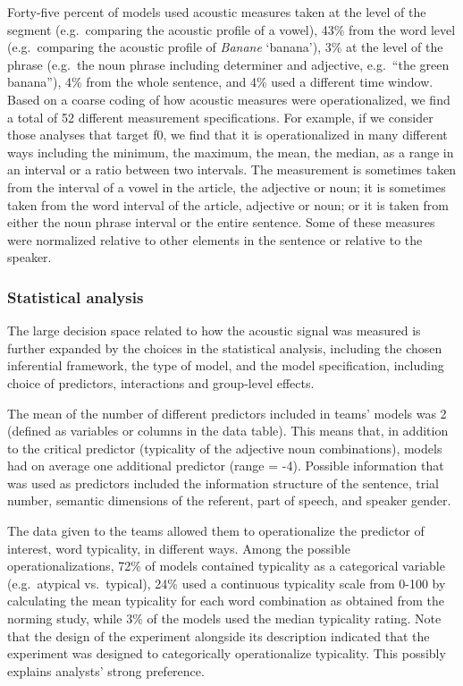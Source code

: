 \documentclass[Review,times,sageh]{sagej}
\begin{document}
Forty-five percent of models used acoustic measures taken at the level of the segment (e.g.~comparing the acoustic profile of a vowel), 43\% from the word level (e.g.~comparing the acoustic profile of \emph{Banane} `banana'), 3\% at the level of the phrase (e.g.~the noun phrase including determiner and adjective, e.g.~``the green banana''), 4\% from the whole sentence, and 4\% used a different time window.
Based on a coarse coding of how acoustic measures were operationalized, we find a total of 52 different measurement specifications.
For example, if we consider those analyses that target f0, we find that it is operationalized in many different ways including the minimum, the maximum, the mean, the median, as a range in an interval or a ratio between two intervals.
The measurement is sometimes taken from the interval of a vowel in the article, the adjective or noun; it is sometimes taken from the word interval of the article, adjective or noun; or it is taken from either the noun phrase interval or the entire sentence.
Some of these measures were normalized relative to other elements in the sentence or relative to the speaker.

\hypertarget{statistical-analysis}{%
\subsubsection{Statistical analysis}\label{statistical-analysis}}

The large decision space related to how the acoustic signal was measured is further expanded by the choices in the statistical analysis, including the chosen inferential framework, the type of model, and the model specification, including choice of predictors, interactions and group-level effects.

The mean of the number of different predictors included in teams' models was 2 (defined as variables or columns in the data table).
This means that, in addition to the critical predictor (typicality of the adjective noun combinations), models had on average one additional predictor (range = -4).
Possible information that was used as predictors included the information structure of the sentence, trial number, semantic dimensions of the referent, part of speech, and speaker gender.

The data given to the teams allowed them to operationalize the predictor of interest, word typicality, in different ways.
Among the possible operationalizations, 72\% of models contained typicality as a categorical variable (e.g.~atypical vs.~typical), 24\% used a continuous typicality scale from 0-100 by calculating the mean typicality for each word combination as obtained from the norming study, while 3\% of the models used the median typicality rating.
Note that the design of the experiment alongside its description indicated that the experiment was designed to categorically operationalize typicality. This possibly explains analysts' strong preference.
\end{document}
